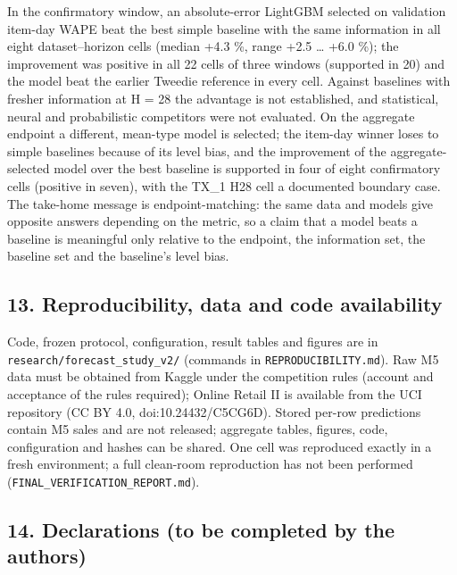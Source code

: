 \documentclass[
]{article}
\begin{document}
In the confirmatory window, an absolute-error LightGBM selected on
validation item-day WAPE beat the best simple baseline with the same
information in all eight dataset--horizon cells (median +4.3 \%, range
+2.5 \ldots{} +6.0 \%); the improvement was positive in all 22 cells of
three windows (supported in 20) and the model beat the earlier Tweedie
reference in every cell. Against baselines with fresher information at H
= 28 the advantage is not established, and statistical, neural and
probabilistic competitors were not evaluated. On the aggregate endpoint
a different, mean-type model is selected; the item-day winner loses to
simple baselines because of its level bias, and the improvement of the
aggregate-selected model over the best baseline is supported in four of
eight confirmatory cells (positive in seven), with the TX\_1 H28 cell a
documented boundary case. The take-home message is endpoint-matching:
the same data and models give opposite answers depending on the metric,
so a claim that a model beats a baseline is meaningful only relative to
the endpoint, the information set, the baseline set and the baseline's
level bias.

\subsection{13. Reproducibility, data and code
availability}\label{reproducibility-data-and-code-availability}

Code, frozen protocol, configuration, result tables and figures are in
\texttt{research/forecast\_study\_v2/} (commands in
\texttt{REPRODUCIBILITY.md}). Raw M5 data must be obtained from Kaggle
under the competition rules (account and acceptance of the rules
required); Online Retail II is available from the UCI repository (CC BY
4.0, doi:10.24432/C5CG6D). Stored per-row predictions contain M5 sales
and are not released; aggregate tables, figures, code, configuration and
hashes can be shared. One cell was reproduced exactly in a fresh
environment; a full clean-room reproduction has not been performed
(\texttt{FINAL\_VERIFICATION\_REPORT.md}).

\subsection{14. Declarations (to be completed by the
authors)}\label{declarations-to-be-completed-by-the-authors}
\end{document}
